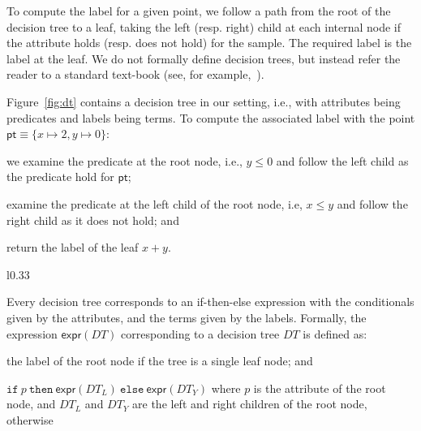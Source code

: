 \documentclass{llncs}
\newcommand\Point{\mathsf{pt}}
\newcommand\Pred{p}
\newcommand\ITE[3]{\mathtt{if}~#1~\mathtt{then}~#2~\mathtt{else}~#3}
\newcommand\DecisionTree{\mathit{DT}}
\newcommand\DTtoExpr[1]{\mathsf{expr}(#1)}
\newcommand\node{v}
\begin{document}
To compute the label for a given point, we follow a path from the root
of the decision tree to a leaf, taking the left (resp. right) child at
each internal node if the attribute holds (resp.  does not hold) for the
sample.
The required label is the label at the leaf.
We do not formally define decision trees, but instead refer the reader
to a standard text-book (see, for example,~\cite{bishop-book}).

\begin{example}
  Figure~\ref{fig:dt} contains a decision tree in our setting, i.e.,
  with attributes being predicates and labels being terms.
  To compute the associated label with the point $\Point \equiv \{ x
  \mapsto 2, y \mapsto 0 \}$:
  \begin{inparaenum}[(a)]
  \item we examine the predicate at the root node, i.e., $y \leq 0$ and
    follow the left child as the predicate hold for $\Point$;
  \item examine the predicate at the left child of the root node, i.e,
    $x \leq y$ and follow the right child as it does not hold; and
  \item return the label of the leaf $x + y$.
  \end{inparaenum}
\end{example}

\begin{wrapfigure}{l}{0.33\textwidth}
  \centering
  \vspace*{1pt}
  \caption{Sample decision tree}
  \label{fig:dt}
\end{wrapfigure}
Every decision tree corresponds to an if-then-else expression with the
conditionals given by the attributes, and the terms given by the labels.
Formally, the expression $\DTtoExpr{\DecisionTree}$ corresponding to a
decision tree $\DecisionTree$ is defined as:
\begin{inparaenum}[(a)]
\item the label of the root node if the tree is a single leaf node; and
\item
  $\ITE{\Pred}{\DTtoExpr{\DecisionTree_L}}{\DTtoExpr{\DecisionTree_Y}}$
  where $\Pred$ is the attribute of the root node, and $\DecisionTree_L$ and
  $\DecisionTree_Y$ are the left and right children of the root node,
  otherwise
\end{inparaenum}
\end{document}
